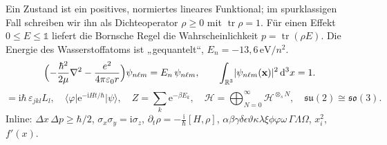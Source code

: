 \noindent\textbf{\specname} \hfill {\small\specnote}\par\medskip
Ein Zustand ist ein positives, normiertes lineares Funktional; im spurklassigen Fall
schreiben wir ihn als Dichteoperator $\rho\geq 0$ mit $\operatorname{tr}\rho = 1$. Für einen
Effekt $0\leq E\leq \mathbb{1}$ liefert die Bornsche Regel die Wahrscheinlichkeit
$p = \operatorname{tr}(\rho E)$. Die Energie des Wasserstoffatoms ist „gequantelt“, $E_n=-13{,}6\,\mathrm{eV}/n^2$.
\begin{equation}
  \Bigl(-\frac{\hbar^2}{2\mu}\nabla^2-\frac{e^2}{4\pi\varepsilon_0 r}\Bigr)\psi_{n\ell m}
  = E_n\,\psi_{n\ell m},\qquad
  \int_{\mathbb{R}^3}\lvert\psi_{n\ell m}(\mathbf{x})\rvert^2\,\mathrm{d}^3x = 1 .
\end{equation}
\begin{equation}
  [L_j,L_k]=\mathrm{i}\hbar\,\varepsilon_{jkl}L_l,\quad
  \langle\varphi\vert\mathrm{e}^{-\mathrm{i}Ht/\hbar}\vert\psi\rangle,\quad
  Z=\sum_{k}\mathrm{e}^{-\beta E_k},\quad
  \mathcal{H}=\bigoplus_{N=0}^{\infty}\mathcal{H}^{\otimes_s N},\quad
  \mathfrak{su}(2)\cong\mathfrak{so}(3).
\end{equation}
Inline: $\Delta x\,\Delta p\geq\hbar/2$, $\sigma_x\sigma_y=\mathrm{i}\sigma_z$, $\partial_t\rho=-\tfrac{\mathrm{i}}{\hbar}[H,\rho]$, $\alpha\beta\gamma\delta\epsilon\vartheta\kappa\lambda\xi\phi\varphi\omega\,\Gamma\Lambda\Omega$, $x^{2}_{i}$, $f'(x)$.
